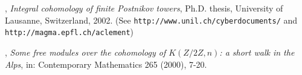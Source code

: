 \begin{thebibliography}{99}




, \textit{Integral cohomology of finite Postnikov towers}, Ph.D. thesis, University of Lausanne, Switzerland, 2002. (See {\tt http://www.unil.ch/cyberdocuments/} and {\tt http://magma.epfl.ch/aclement})

, \textit{Some free modules over the cohomology of $K(Z/2Z,n)$: a short walk in the Alps}, in: Contemporary Mathematics 265 (2000), 7-20.










\end{thebibliography}
